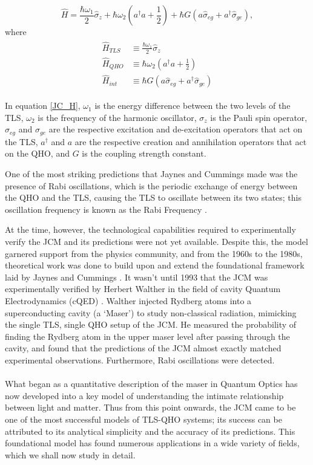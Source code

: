 \documentclass[12pt,a4paper]{article}
\begin{document}
\begin{equation}
    \hat{H} = \frac{\hbar\omega_1}{2}\hat{\sigma}_z + \hbar\omega_2(a^\dagger a + \frac{1}{2}) + \hbar G(a\hat{\sigma}_{eg} + a^\dagger\hat{\sigma}_{ge}), 
\end{equation} \label{JC_H}
where 
\begin{align*}
    \begin{aligned}
        \hat{H}_{TLS} &\equiv \frac{\hbar\omega_1}{2}\hat{\sigma}_z \\
        \hat{H}_{QHO} &\equiv \hbar\omega_2(a^\dagger a + \frac{1}{2}) \\
        \hat{H}_{int} &\equiv \hbar G(a\hat{\sigma}_{eg} + a^\dagger\hat{\sigma}_{ge})
    \end{aligned}
\end{align*}

In equation \eqref{JC_H}, $\omega_1$ is the energy difference between the two levels of the TLS, $\omega_2$ is the frequency of the harmonic oscillator, $\sigma_z$ is the Pauli spin operator, $\sigma_{eg}$ and $\sigma_{ge}$ are the respective excitation and de-excitation operators that act on the TLS, $a^\dagger$ and $a$ are the respective creation and annihilation operators that act on the QHO, and $G$ is the coupling strength constant. 

One of the most striking predictions that Jaynes and Cummings made was the presence of Rabi oscillations, which is the periodic exchange of energy between the QHO and the TLS, causing the TLS to oscillate between its two states; this oscillation frequency is known as the Rabi Frequency \cite{Context_-Rabi_oscillations}. 

At the time, however, the technological capabilities required to experimentally verify the JCM and its predictions were not yet available. Despite this, the model garnered support from the physics community, and from the 1960s to the 1980s, theoretical work was done to build upon and extend the foundational framework laid by Jaynes and Cummings \cite{Context1965-TheoreticalJCM, Context1980-TheoreticalJCM, Context1984-TheoreticalJCM}. It wasn't until 1993 that the JCM was experimentally verified by Herbert Walther in the field of cavity Quantum Electrodynamics (cQED) \cite{Context1993-JC_Verification}. Walther injected Rydberg atoms into a superconducting cavity (a `Maser') to study non-classical radiation, mimicking the single TLS, single QHO setup of the JCM. He measured the probability of finding the Rydberg atom in the upper maser level after passing through the cavity, and found that the predictions of the JCM almost exactly matched experimental observations. Furthermore, Rabi oscillations were detected.\\
\\
What began as a quantitative description of the maser in Quantum Optics has now developed into a key model of understanding the intimate relationship between light and matter. Thus from this point onwards, the JCM came to be one of the most successful models of TLS-QHO systems; its success can be attributed to its analytical simplicity and the accuracy of its predictions. This foundational model has found numerous applications in a wide variety of fields, which we shall now study in detail.
\end{document}

